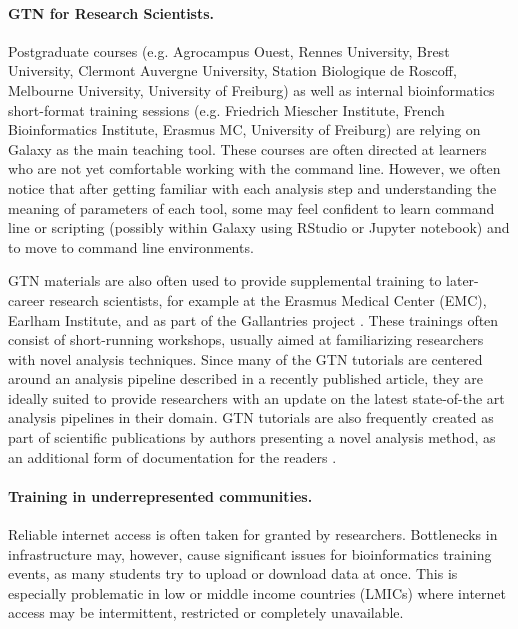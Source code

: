 \paragraph{GTN for Research Scientists.}
Postgraduate courses (e.g. Agrocampus Ouest, Rennes University, Brest University, Clermont Auvergne University, Station Biologique de Roscoff, Melbourne University, University of Freiburg) as well as internal bioinformatics short-format training sessions (e.g. Friedrich Miescher Institute, French Bioinformatics Institute, Erasmus MC, University of Freiburg) are relying on Galaxy as the main teaching tool.
These courses are often directed at learners who are not yet comfortable working with the command line. However, we often notice that after getting familiar with each analysis step and understanding the meaning of parameters of each tool, some may feel confident to learn command line or scripting (possibly within Galaxy using RStudio or Jupyter notebook) and  to move to command line environments. %

GTN materials are also often used to provide supplemental training to later-career research scientists, for example at the Erasmus Medical Center (EMC), Earlham Institute, and as part of the Gallantries project \cite{gallantries}. These trainings often consist of short-running workshops, usually aimed at familiarizing researchers with novel analysis techniques. Since many of the GTN tutorials are centered around an analysis pipeline described in a recently published article, they are ideally suited to provide researchers with an update on the latest state-of-the art analysis pipelines in their domain. 
GTN tutorials are also frequently created as part of scientific publications by authors presenting a novel analysis method, as an additional form of documentation for the readers \cite{Mehta2021, deKoning2020, Tekman2020, Circos, fahrner2022democratizing, bray2022galaxy}.

\paragraph{Training in underrepresented communities.}
Reliable internet access is often taken for granted by researchers. Bottlenecks in infrastructure may, however, cause significant issues for bioinformatics training events, as many students try to upload or download data at once. This is especially problematic in low or middle income countries (LMICs) where internet access may be intermittent, restricted or completely unavailable.

